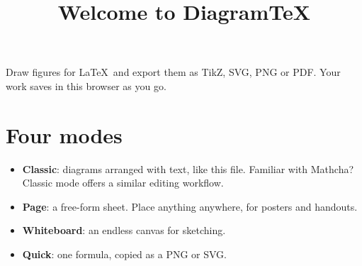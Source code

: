 \documentclass[11pt]{article}
\title{Welcome to DiagramTeX}
\date{}
\begin{document}
\maketitle

Draw figures for \LaTeX\ and export them as TikZ, SVG, PNG or PDF. Your work saves in this browser as you go.

\section*{Four modes}
\begin{itemize}
  \item \textbf{Classic}: diagrams arranged with text, like this file. Familiar with Mathcha? Classic mode offers a similar editing workflow.
  \item \textbf{Page}: a free-form sheet. Place anything anywhere, for posters and handouts.
  \item \textbf{Whiteboard}: an endless canvas for sketching.
  \item \textbf{Quick}: one formula, copied as a PNG or SVG.
\end{itemize}
\end{document}
